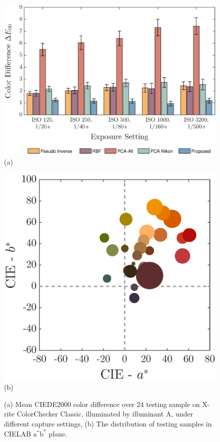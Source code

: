 \documentclass[9pt,twocolumn,twoside]{osajnl}
\begin{document}
	\begin{figure}[tbp]
		\centering
		\begin{minipage}[b]{0.57\linewidth}
			\centering
			\includegraphics[width=\linewidth]{Fig14a}\\
			(a)
		\end{minipage}%
		\begin{minipage}[b]{0.43\linewidth}
			\centering
			\includegraphics[width=\linewidth]{Fig14b}\\
			(b)
		\end{minipage}
		\caption{(a) Mean CIEDE2000 color difference over 24 testing sample on X-rite ColorChecker Classic, illuminated by illuminant A, under different capture settings, (b) The distribution of testing samples in CIELAB $\text{a}^*\text{b}^*$ plane.}
		\label{fig:14}
	\end{figure}
	
\end{document}
